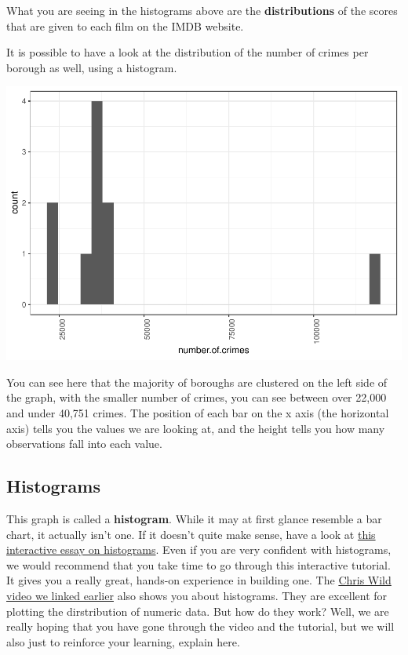 \documentclass[
]{book}
\begin{document}
What you are seeing in the histograms above are the \textbf{distributions} of the scores that are given to each film on the IMDB website.

It is possible to have a look at the distribution of the number of crimes per borough as well, using a histogram.

\includegraphics{bookdown-demo_files/figure-latex/unnamed-chunk-18-1.pdf}

You can see here that the majority of boroughs are clustered on the left side of the graph, with the smaller number of crimes, you can see between over 22,000 and under 40,751 crimes. The position of each bar on the x axis (the horizontal axis) tells you the values we are looking at, and the height tells you how many observations fall into each value.

\hypertarget{histograms}{%
\subsection{Histograms}\label{histograms}}

This graph is called a \textbf{histogram}. While it may at first glance resemble a bar chart, it actually isn't one. If it doesn't quite make sense, have a look at
\href{http://tinlizzie.org/histograms/}{this interactive essay on histograms}. Even if you are very confident with histograms, we would recommend that you take time to go through this interactive tutorial. It gives you a really great, hands-on experience in building one. The \href{https://www.youtube.com/watch?v=U3lk2nQYfAQ\&amp=\&list=PL8CRAVedURQrlxeFfme0TEgaj1_h67JUR\&amp=\&index=4}{Chris Wild video we linked earlier} also shows you about histograms. They are excellent for plotting the dirstribution of numeric data. But how do they work? Well, we are really hoping that you have gone through the video and the tutorial, but we will also just to reinforce your learning, explain here.
\end{document}
